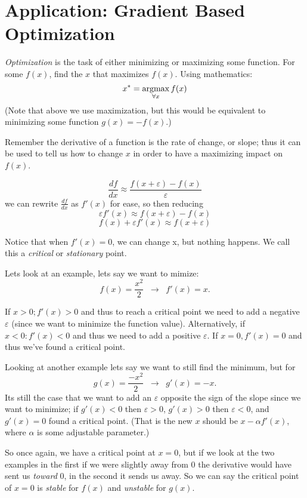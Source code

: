 
\section{Application: Gradient Based Optimization}
\emph{Optimization} is the task of either minimizing or maximizing some function. 
For some $f(x)$, find the $x$ that maximizes $f(x)$. 
Using mathematics: 
\[ x^* = \operatorname*{argmax}_{\forall x} f(x) \]
(Note that above we use maximization, but this would be equivalent to minimizing some function $g(x)=-f(x)$.)

Remember the derivative of a function is the rate of change, or slope; 
thus it can be used to tell us how to change $x$ in order to have a maximizing impact on $f(x)$. 

\[\frac{df}{dx} \approx \frac{f(x+\varepsilon)-f(x)}{\varepsilon}\]
we can rewrite $\frac{df}{dx}$ as $f'(x)$ for ease, so then reducing
\[\varepsilon f'(x) \approx f(x+\varepsilon)-f(x)\]
\[f(x) + \varepsilon f'(x) \approx f(x+\varepsilon)\]

Notice that when $f'(x)=0$, we can change x, but nothing happens. 
We call this a \emph{critical} or \emph{stationary} point. 

Lets look at an example, lets say we want to mimize: 
\[f(x) = \frac{x^2}{2}  \;\;\rightarrow\;\; f'(x) = x.\]

If $x>0; f'(x)>0$ and thus to reach a critical point we need to add a negative $\varepsilon$ 
(since we want to minimize the function value). 
Alternatively, if $x<0: f'(x)<0$ and thus we need to add a positive $\varepsilon$. 
If $x=0, f'(x)=0$ and thus we've found a critical point. 

Looking at another example lets say we want to still find the minimum, but for 
\[g(x) = \frac{-x^2}{2}  \;\;\rightarrow\;\; g'(x) = -x.\]
Its still the case that we want to add an $\varepsilon$ opposite the sign of the slope since we want to minimize; 
if $g'(x)<0$ then $\varepsilon>0$, $g'(x)>0$ then $\varepsilon<0$, and $g'(x)=0$ found a critical point. 
(That is the new $x$ should be {\color{red}$x-\alpha f'(x)$}, where $\alpha$ is some adjustable parameter.)

So once again, we have a critical point at $x=0$, 
but if we look at the two examples in the first if we were slightly away from 0 the derivative would have sent us \textit{toward} 0, in the second it sends us away. 
So we can say the critical point of $x=0$ is \emph{stable} for $f(x)$ and \emph{unstable} for $g(x)$. 

